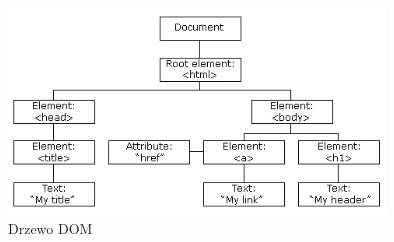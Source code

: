 \begin{figure}[H]
  \centering
    \includegraphics[width=100mm]{ge/htmltree2.jpg}
  \caption{Drzewo DOM}
  \label{fig:domtree}
\end{figure}
